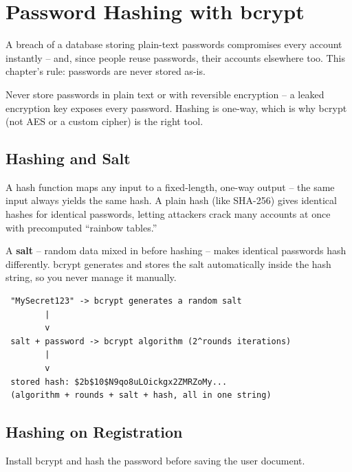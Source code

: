 \chapter{Password Hashing with bcrypt}

A breach of a database storing plain-text passwords compromises every account instantly -- and, since people reuse passwords, their accounts elsewhere too. This chapter's rule: passwords are never stored as-is.

\begin{warnbox}[WARNING]
Never store passwords in plain text or with reversible encryption -- a leaked encryption key exposes every password. Hashing is one-way, which is why bcrypt (not AES or a custom cipher) is the right tool.
\end{warnbox}

\section{Hashing and Salt}

A hash function maps any input to a fixed-length, one-way output -- the same input always yields the same hash. A plain hash (like SHA-256) gives identical hashes for identical passwords, letting attackers crack many accounts at once with precomputed ``rainbow tables.''

A \textbf{salt} -- random data mixed in before hashing -- makes identical passwords hash differently. bcrypt generates and stores the salt automatically inside the hash string, so you never manage it manually.

\begin{diagrambox}
\begin{verbatim}
 "MySecret123" -> bcrypt generates a random salt
        |
        v
 salt + password -> bcrypt algorithm (2^rounds iterations)
        |
        v
 stored hash: $2b$10$N9qo8uLOickgx2ZMRZoMy...
 (algorithm + rounds + salt + hash, all in one string)
\end{verbatim}
\end{diagrambox}

\section{Hashing on Registration}

Install bcrypt and hash the password before saving the user document.


